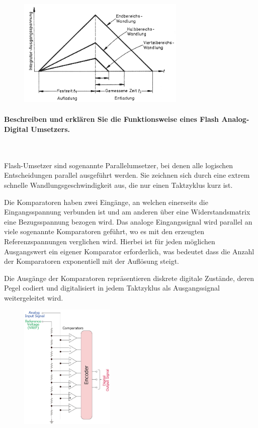\documentclass[a4paper, 11pt, ngerman, parskip=half-]{scrartcl}
\begin{document}
\begin{figure}[H]
    \centering
    \includegraphics[width=8cm]{image/04/8}
\end{figure}

\paragraph{Beschreiben und erklären Sie die Funktionsweise eines Flash Analog-Digital Umsetzers.} ~

Flash-Umsetzer sind sogenannte Parallelumsetzer, bei denen alle logischen Entscheidungen parallel
ausgeführt werden. Sie zeichnen sich durch eine extrem schnelle Wandlungsgeschwindigkeit aus, die
nur einen Taktzyklus kurz ist.

Die Komparatoren haben zwei Eingänge, an welchen einerseits die Eingangsspannung verbunden ist und
am anderen über eine Widerstandsmatrix eine Bezugsspannung bezogen wird. Das analoge Eingangssignal
wird parallel an viele sogenannte Komparatoren geführt, wo es mit den erzeugten Referenzspannungen
verglichen wird. Hierbei ist für jeden möglichen Ausgangswert ein eigener Komparator erforderlich,
was bedeutet dass die Anzahl der Komparatoren exponentiell mit der Auflösung steigt.

Die Ausgänge der Komparatoren repräsentieren diskrete digitale Zustände, deren Pegel codiert und
digitalisiert in jedem Taktzyklus als Ausgangssignal weitergeleitet wird.

\begin{figure}[H]
    \centering
    \includegraphics[height=6cm]{image/04/9}
\end{figure}
\end{document}
